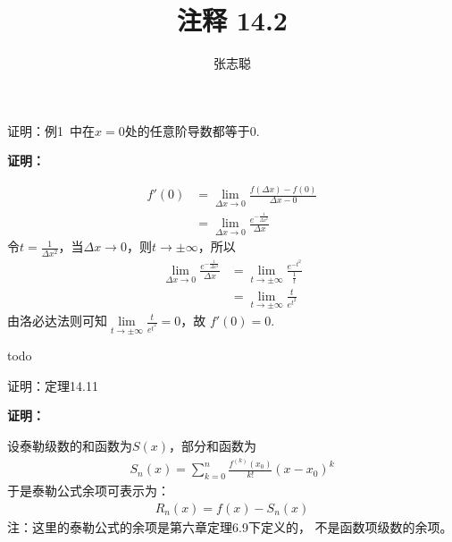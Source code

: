 \documentclass{article}
\begin{document}
\title{注释 14.2}
\author{张志聪}
\maketitle

\begin{zremark}
  证明：例1 $\,$中在$x = 0$处的任意阶导数都等于0.
\end{zremark}

\textbf{证明：}

\begin{align*}
  f'(0) & = \lim\limits_{\Delta x \to 0} \frac{f(\Delta x) - f(0)}{\Delta x - 0}    \\
        & = \lim\limits_{\Delta x \to 0} \frac{e^{-\frac{1}{\Delta x^2}}}{\Delta x} 
\end{align*}
令$t = \frac{1}{\Delta x^2}$，当$\Delta x \to 0$，则$t \to \pm \infty$，所以
\begin{align*}
  \lim\limits_{\Delta x \to 0} \frac{e^{-\frac{1}{\Delta x^2}}}{\Delta x} 
  & = \lim\limits_{t \to \pm \infty} \frac{e^{-t^2}}{\frac{1}{t}} \\
  & = \lim\limits_{t \to \pm \infty} \frac{t}{e^{t^2}}
\end{align*}
由洛必达法则可知$\lim\limits_{t \to \pm \infty} \frac{t}{e^{t^2}} = 0$，故
$f'(0) = 0$.

todo


\begin{zremark}
  证明：定理14.11
\end{zremark}
\textbf{证明：}

设泰勒级数的和函数为$S(x)$，部分和函数为
\begin{align*}
  S_n(x) = \sum \limits_{k = 0}^n \frac{f^{(k)}(x_0)}{k!}(x - x_0)^k
\end{align*}
于是泰勒公式余项可表示为：
\begin{align*}
  R_n(x) = f(x) - S_n(x)
\end{align*}
注：这里的泰勒公式的余项是第六章定理6.9下定义的，
不是函数项级数的余项。
\end{document}
